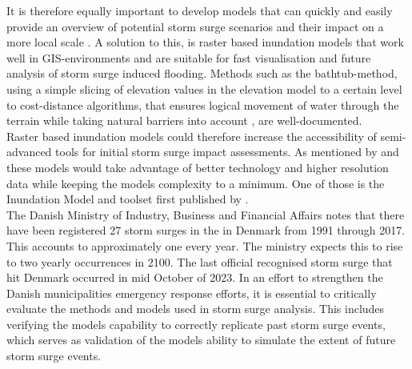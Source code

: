 It is therefore equally important to develop models that can quickly and easily provide an overview of potential storm surge scenarios and their impact on a more local scale \citep{balstrom_kirby_inundation}. A solution to this, is raster based inundation models that work well in GIS-environments and are suitable for fast visualisation and future analysis of storm surge induced flooding. Methods such as the bathtub-method, using a simple slicing of elevation values in the elevation model to a certain level \citep{poulter_raster_2008} to cost-distance algorithms, that ensures logical movement of water through the terrain while taking natural barriers into account \citep{williams_geographic_2022, li_delineating_2014}, are well-documented.\\ Raster based inundation models could therefore increase the accessibility of semi-advanced tools for initial storm surge impact assessments. As mentioned by \cite{balstrom_kirby_inundation} and \cite{li_delineating_2014} these models would take advantage of better technology and higher resolution data while keeping the models complexity to a minimum. One of those is the Inundation Model and toolset first published by \cite{balstrom_kirby_inundation}.\\

The Danish Ministry of Industry, Business and Financial Affairs \citep{erhvervsministeriet_fremtidige_nodate} notes that there have been registered 27 storm surges in the in Denmark from 1991 through 2017. This accounts to approximately one every year. The ministry expects this to rise to two yearly occurrences in 2100. The last official recognised storm surge that hit Denmark occurred in mid October of 2023. In an effort to strengthen the Danish municipalities emergency response efforts, it is essential to critically evaluate the methods and models used in storm surge analysis. This includes verifying the models capability to correctly replicate past storm surge events, which serves as validation of the models ability to simulate the extent of future storm surge events.\\ 